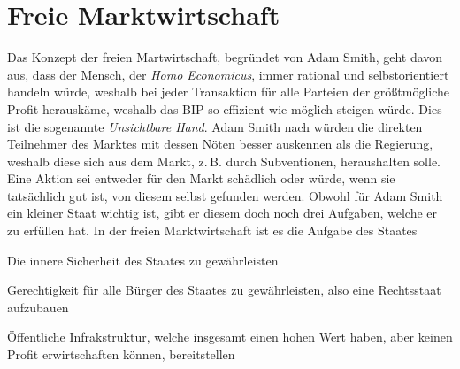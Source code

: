 \documentclass{article}
\begin{document}
 
 
\section{Freie Marktwirtschaft}
\begin{multicols}{1}
\noindent Das Konzept der freien Martwirtschaft, begründet von Adam Smith, geht davon aus, dass der Mensch, der \emph{Homo Economicus}, immer rational und selbstorientiert handeln würde, weshalb bei jeder Transaktion für alle Parteien der größtmögliche Profit herauskäme, weshalb das BIP so effizient wie möglich steigen würde. Dies ist die sogenannte \emph{Unsichtbare Hand}. \newline
Adam Smith nach würden die direkten Teilnehmer des Marktes mit dessen Nöten besser auskennen als die Regierung, weshalb diese sich aus dem Markt, z.\,B. durch Subventionen, heraushalten solle. Eine Aktion sei entweder für den Markt schädlich oder würde, wenn sie tatsächlich gut ist, von diesem selbst gefunden werden. \newline
Obwohl für Adam Smith ein kleiner Staat wichtig ist, gibt er diesem doch noch drei Aufgaben, welche er zu erfüllen hat. In der freien Marktwirtschaft ist es die Aufgabe des Staates
\begin{enumerate*}
 \item Die innere Sicherheit des Staates zu gewährleisten
 \item Gerechtigkeit für alle Bürger des Staates zu gewährleisten, also eine Rechtsstaat aufzubauen
 \item Öffentliche Infrakstruktur, welche insgesamt einen hohen Wert haben, aber keinen Profit erwirtschaften können, bereitstellen
\end{enumerate*}
\end{multicols}
 
\end{document}
